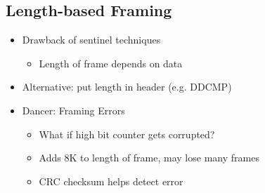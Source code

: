 \subsection{Length-based Framing}
\begin{itemize}[nosep]
    \item Drawback of sentinel techniques
          \begin{itemize}[nosep]
              \item Length of frame depends on data
          \end{itemize}
    \item Alternative: put length in header (e.g. DDCMP)
    \item Dancer: Framing Errors
          \begin{itemize}[nosep]
              \item What if high bit counter gets corrupted?
              \item Adds 8K to length of frame, may lose many frames
              \item CRC checksum helps detect error
          \end{itemize}
\end{itemize}